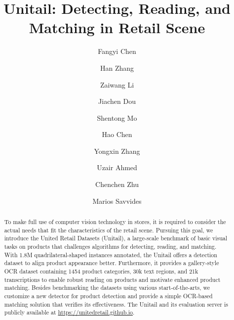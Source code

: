 \documentclass[runningheads]{llncs}
\begin{document}
\pagestyle{headings}
\mainmatter
\def\ECCVSubNumber{1259}  

\title{Unitail: Detecting, Reading, and Matching in Retail Scene} 

\begin{comment}
\titlerunning{ECCV-22 submission ID \ECCVSubNumber} 
\authorrunning{ECCV-22 submission ID \ECCVSubNumber} 
\author{Anonymous ECCV submission}
\institute{Paper ID \ECCVSubNumber}
\end{comment}


\author{Fangyi Chen \and
Han Zhang \and
Zaiwang Li \and
Jiachen Dou \and
Shentong Mo \and
Hao Chen \and
Yongxin Zhang \and
Uzair Ahmed \and
Chenchen Zhu \and
Marios Savvides 
}
\maketitle

\begin{abstract}
To make full use of computer vision technology in stores, it is required to consider the actual needs that fit the characteristics of the retail scene. Pursuing this goal, we introduce the United Retail Datasets (Unitail), a large-scale benchmark of basic visual tasks on products that challenges algorithms for detecting, reading, and matching. With 1.8M quadrilateral-shaped instances annotated, the Unitail offers a detection dataset to align product appearance better. Furthermore, it provides a gallery-style OCR dataset containing 1454 product categories, 30k text regions, and 21k transcriptions to enable robust reading on products and motivate enhanced product matching. Besides benchmarking the datasets using various start-of-the-arts, we customize a new detector for product detection and provide a simple OCR-based matching solution that verifies its effectiveness. The Unitail and its evaluation server is publicly available at  \url{https://unitedretail.github.io}.

\end{abstract}
\end{document}
